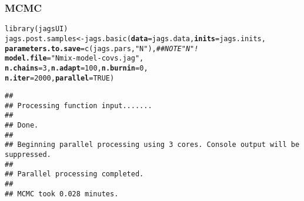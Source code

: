 \documentclass[color=usenames,dvipsnames]{beamer}\usepackage[]{graphicx}\usepackage[]{color}
\makeatletter
\newcommand{\hlnum}[1]{\textcolor[rgb]{0.69,0.494,0}{#1}}%
\newcommand{\hlstr}[1]{\textcolor[rgb]{0.749,0.012,0.012}{#1}}%
\newcommand{\hlcom}[1]{\textcolor[rgb]{0.514,0.506,0.514}{\textit{#1}}}%
\newcommand{\hlstd}[1]{\textcolor[rgb]{0,0,0}{#1}}%
\newcommand{\hlkwb}[1]{\textcolor[rgb]{0,0.341,0.682}{#1}}%
\newcommand{\hlkwc}[1]{\textcolor[rgb]{0,0,0}{\textbf{#1}}}%
\newcommand{\hlkwd}[1]{\textcolor[rgb]{0.004,0.004,0.506}{#1}}%
\newenvironment{kframe}{%
 \def\at@end@of@kframe{}%
 \ifinner\ifhmode%
  \def\at@end@of@kframe{\end{minipage}}%
  \begin{minipage}{\columnwidth}%
 \fi\fi%
 \def\FrameCommand##1{\hskip\@totalleftmargin \hskip-\fboxsep
 \colorbox{shadecolor}{##1}\hskip-\fboxsep
     \hskip-\linewidth \hskip-\@totalleftmargin \hskip\columnwidth}%
 \MakeFramed {\advance\hsize-\width
   \@totalleftmargin\z@ \linewidth\hsize
   \@setminipage}}%
 {\par\unskip\endMakeFramed%
 \at@end@of@kframe}
\newenvironment{knitrout}{}{} %
\makeatother
\begin{document}
\begin{frame}[fragile]
  \frametitle{MCMC}
  \small
\begin{knitrout}\scriptsize
{}\color{fgcolor}\begin{kframe}
\begin{alltt}
\hlkwd{library}\hlstd{(jagsUI)}
\hlstd{jags.post.samples} \hlkwb{<-} \hlkwd{jags.basic}\hlstd{(}\hlkwc{data}\hlstd{=jags.data,} \hlkwc{inits}\hlstd{=jags.inits,}
                                \hlkwc{parameters.to.save}\hlstd{=}\hlkwd{c}\hlstd{(jags.pars,} \hlstr{"N"}\hlstd{),} \hlcom{## NOTE "N"!}
                                \hlkwc{model.file}\hlstd{=}\hlstr{"Nmix-model-covs.jag"}\hlstd{,}
                                \hlkwc{n.chains}\hlstd{=}\hlnum{3}\hlstd{,} \hlkwc{n.adapt}\hlstd{=}\hlnum{100}\hlstd{,} \hlkwc{n.burnin}\hlstd{=}\hlnum{0}\hlstd{,}
                                \hlkwc{n.iter}\hlstd{=}\hlnum{2000}\hlstd{,} \hlkwc{parallel}\hlstd{=}\hlnum{TRUE}\hlstd{)}
\end{alltt}
\begin{verbatim}
## 
## Processing function input....... 
## 
## Done. 
##  
## Beginning parallel processing using 3 cores. Console output will be suppressed.
## 
## Parallel processing completed.
## 
## MCMC took 0.028 minutes.
\end{verbatim}
\end{kframe}
\end{knitrout}
\end{frame}
\end{document}

